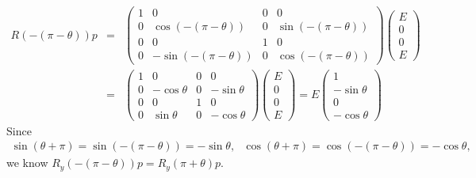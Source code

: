 \documentclass[11pt]{article}
\begin{document}
\section{ }
\begin{eqnarray}
    R(-(\pi-\theta)) p &=&
    \begin{pmatrix}
        1 & 0 & 0 & 0 \\
        0 &\cos(-(\pi-\theta)) & 0 &\sin(-(\pi-\theta)) \\
        0 & 0 & 1 & 0\\
        0 &-\sin(-(\pi-\theta)) & 0 & \cos(-(\pi-\theta))
    \end{pmatrix}
    \begin{pmatrix}
        E \\ 0 \\ 0 \\ E
    \end{pmatrix}\\
    &=& 
    \begin{pmatrix}
        1 & 0 & 0 & 0 \\
        0 &-\cos\theta & 0 &-\sin\theta \\
        0 & 0 & 1 & 0\\
        0 &\sin\theta & 0 & -\cos\theta
    \end{pmatrix}
    \begin{pmatrix}
        E \\ 0 \\ 0 \\ E
    \end{pmatrix}
    = E
    \begin{pmatrix}
        1 \\ -\sin\theta  \\ 0 \\ -\cos\theta
    \end{pmatrix}
\end{eqnarray}
Since
\begin{eqnarray}
    \sin(\theta+\pi)=\sin(-(\pi-\theta))=-\sin\theta,~~~\cos(\theta+\pi)=\cos(-(\pi-\theta))=-\cos\theta,
\end{eqnarray}
we know $R_y(-(\pi-\theta))p = R_y(\pi+\theta) p$.
\end{document}
